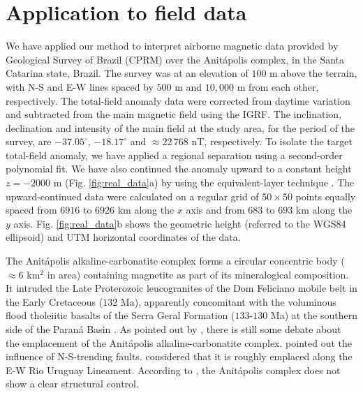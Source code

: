 \section{Application to field data}

We have applied our method to interpret airborne magnetic data provided by 
Geological Survey of Brazil (CPRM) over the Anit{\'a}polis complex, 
in the Santa Catarina state, Brazil. 
The survey was at an elevation of $100$ m above the terrain, 
with N-S and E-W lines spaced by $500$ m and $10,000$ m from each other, respectively. 
The total-field anomaly data were corrected from daytime variation and 
subtracted from the main magnetic field using the IGRF. 
The inclination, declination and intensity of the main field at the study area, 
for the period of the survey, are $-37.05^{\circ}$, $-18.17^{\circ}$ and 
$\approx 22 \, 768 $ nT, respectively.
To isolate the target total-field anomaly, we have applied 
a regional separation using a second-order polynomial fit. We have also continued 
the anomaly upward to a constant height $z=-2000$ m (Fig. \ref{fig:real_data}a) by 
using the equivalent-layer technique \citep{dampney1969,emilia1973,oliveirajr-barbosa2013}. 
The upward-continued data were calculated on a regular grid of $50 \times 50$ points 
equally spaced from $6916$ to $6926$ km along the $x$ axis and from 
$683$ to $693$ km along the $y$ axis. 
Fig. \ref{fig:real_data}b shows the geometric height (referred to the WGS84 ellipsoid) 
and UTM horizontal coordinates of the data.

The Anit{\'a}polis alkaline-carbonatite complex forms a circular concentric body 
($\approx 6$ km$^{2}$ in area) containing magnetite as part of its mineralogical 
composition. It intruded the Late Proterozoic leucogranites of the Dom Feliciano 
mobile belt in the Early Cretaceous ($132$ Ma), apparently concomitant with the 
voluminous flood tholeiitic basalts of the Serra Geral Formation ($133$-$130$ Ma) 
at the southern side of the Paran{\'a} Basin \citep{gibson-1999, scheibe-etal2005}.
As pointed out by \citet{GOMES2018}, there is still some debate about the emplacement 
of the Anit{\'a}polis alkaline-carbonatite complex. 
\citet{melcher-coutinho1966} pointed out the influence of N-S-trending faults. 
\citet{scheibe-etal2005} considered that it is roughly emplaced along the E-W Rio 
Uruguay Lineament. According to \citet{riccomini-etal2005}, the Anit{\'a}polis 
complex does not show a clear structural control. 

